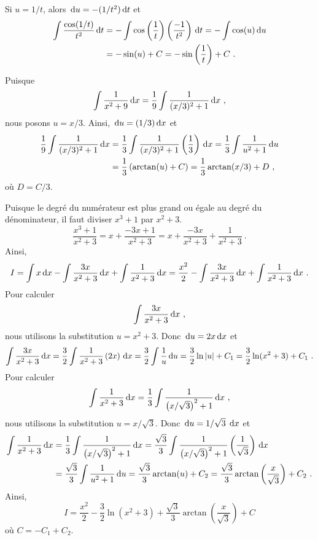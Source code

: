 {
Si $u= 1/t$, alors $\,\mathrm{d}u = -(1/t^2) \,\mathrm{d}t$ et
\begin{align*}
\int \frac{\cos(1/t)}{t^2} \,\mathrm{d}t &=
-\int \cos\left(\frac{1}{t}\right)\left( \frac{-1}{t^2}\right) \,\mathrm{d}t =
-\int \cos(u) \,\mathrm{d}u \\
&= -\sin(u) + C = -\sin\left(\frac{1}{t}\right) + C \ .
\end{align*}

Puisque
\[
\int \frac{1}{x^2+9} \,\mathrm{d}x = \frac{1}{9} \int \frac{1}{(x/3)^2+1} \,\mathrm{d}x \ ,
\]
nous posons $u=x/3$.  Ainsi, $\,\mathrm{d}u = (1/3) \,\mathrm{d}x$ et
\begin{align*}
\frac{1}{9} \int \frac{1}{(x/3)^2+1} \,\mathrm{d}x
&= \frac{1}{3} \int \frac{1}{(x/3)^2+1} \left(\frac{1}{3}\right) \,\mathrm{d}x
= \frac{1}{3} \int \frac{1}{u^2+1} \,\mathrm{d}u \\
&= \frac{1}{3} \left( \arctan(u) + C \right)
= \frac{1}{3} \arctan(x/3) + D \ ,
\end{align*}
où $D=C/3$.

Puisque le degré du numérateur est plus grand ou égale au degré du
dénominateur, il faut diviser $x^3+1$ par $x^2+3$.
\[
\frac{x^3+1}{x^2+3} = x + \frac{-3x+1}{x^2+3}
= x + \frac{-3x}{x^2+3} + \frac{1}{x^2+3} \ .
\]
Ainsi,
\[
I = \int x \,\mathrm{d}x - \int \frac{3x}{x^2+3} \,\mathrm{d}x + \int
\frac{1}{x^2+3}\,\mathrm{d}x
= \frac{x^2}{2} - \int \frac{3x}{x^2+3} \,\mathrm{d}x +
\int \frac{1}{x^2+3}\,\mathrm{d}x \ .
\]
Pour calculer
\[
\int \frac{3x}{x^2+3} \,\mathrm{d}x \ ,
\]
nous utilisons la substitution $u=x^2+3$.  Donc $\,\mathrm{d}u = 2x \,\mathrm{d}x$ et
\[
\int \frac{3x}{x^2+3} \,\mathrm{d}x
= \frac{3}{2} \int \frac{1}{x^2+3}\left( 2x\right) \,\mathrm{d}x
= \frac{3}{2} \int \frac{1}{u} \,\mathrm{d}u
= \frac{3}{2} \ln|u| + C_1 = \frac{3}{2}\ln(x^2+3) + C_1 \ .
\]
Pour calculer
\[
\int \frac{1}{x^2+3}\dx{x} =
\frac{1}{3} \int \frac{1}{\left(x/\sqrt{3}\right)^2+1}\dx{x} \ ,
\]
nous utilisons la substitution $u=x/\sqrt{3}$.  Donc
$\,\mathrm{d}u = 1/\sqrt{3} \; \,\mathrm{d}x$ et
\begin{align*}
\int \frac{1}{x^2+3}\,\mathrm{d}x &=
\frac{1}{3} \int \frac{1}{\left(x/\sqrt{3}\right)^2+1}\,\mathrm{d}x
= \frac{\sqrt{3}}{3}
\int \frac{1}{\left(x/\sqrt{3}\right)^2+1}
\left(\frac{1}{\sqrt{3}}\right) \,\mathrm{d}x \\
&= \frac{\sqrt{3}}{3} \int \frac{1}{u^2+1} \,\mathrm{d}u
= \frac{\sqrt{3}}{3} \arctan(u) + C_2
= \frac{\sqrt{3}}{3} \arctan\left(\frac{x}{\sqrt{3}}\right) + C_2 \ .
\end{align*}
Ainsi,
\[
I = \frac{x^2}{2} - \frac{3}{2}\ln(x^2+3)
+ \frac{\sqrt{3}}{3} \arctan\left(\frac{x}{\sqrt{3}}\right) + C
\]
où $C = -C_1 + C_2$.

}
